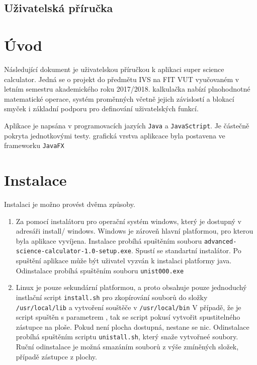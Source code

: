 \documentclass[11pt, a4paper, titlepage]{article}
\begin{document}
	
	\pagestyle{fancy}

	\begin{center}
		\section*{Uživatelská příručka}
	\end{center}

	\tableofcontents

	\section{Úvod}
	Následující dokument je uživatelskou příručkou k aplikaci super science calculator. Jedná se o projekt do
	předmětu IVS na FIT VUT vyučovaném v letním semestru akademického roku 2017/2018. kalkulačka nabízí 
	plnohodnotné matematické operace, systém proměnných včetně jejich závislostí a blokací smyček i základní podporu
	pro definování uživatelských funkcí.

	Aplikace je napsána v programovacích jazyích \texttt{Java} a \texttt{JavaSctript}. Je částečně pokryta jednotkovými testy.
	grafická vrstva aplikcace byla postavena ve frameworku \texttt{JavaFX}

	\section{Instalace}

	Instalaci je možno provést dvěma způsoby.

	\begin{enumerate}
		\item Za pomocí instalátoru pro operační systém windows, který je dostupný v adresáři install/ windows.
		Windows je zároveň hlavní platformou, pro kterou byla aplikace vyvíjena. Instalace probíhá spuštěním
		souboru \texttt{advanced-science-calculator-1.0-setup.exe}. Spustí se standartní instalátor.
		Po spuštění aplikace může být uživatel vyzván k instalaci platformy java. 
		Odinstalace probíhá spuštěním souboru \texttt{unist000.exe}

		\item Linux je pouze sekundární platformou, a proto obsahuje pouze jednoduchý instlační script \texttt{install.sh}
		pro zkopírování souborů do složky \texttt{/usr/local/lib} a vytvoření souštěče v \texttt{/usr/local/bin}
		V případě, že je script spuštěn s parametrem , tak se script pokusí vytvořit spustitelného
		zástupce na ploše. Pokud není plocha dostupná, nestane se nic.
		Odinstalace probíhá spuštěním scriptu \texttt{unistall.sh}, který snaže vytvořneé soubory. Ruční odinstalace je možná
		smazáním souborů z výše zmíněných složek, případě zástupce z plochy.
	\end{enumerate}
\end{document}
